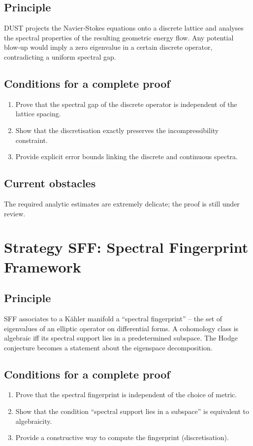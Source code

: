 \documentclass[11pt,a4paper]{article}
\begin{document}
\subsection{Principle}
DUST projects the Navier‑Stokes equations onto a discrete lattice and analyses the spectral properties of the resulting geometric energy flow. Any potential blow‑up would imply a zero eigenvalue in a certain discrete operator, contradicting a uniform spectral gap.

\subsection{Conditions for a complete proof}
\begin{enumerate}
\item Prove that the spectral gap of the discrete operator is independent of the lattice spacing.
\item Show that the discretisation exactly preserves the incompressibility constraint.
\item Provide explicit error bounds linking the discrete and continuous spectra.
\end{enumerate}

\subsection{Current obstacles}
The required analytic estimates are extremely delicate; the proof is still under review.

\section{Strategy SFF: Spectral Fingerprint Framework}

\subsection{Principle}
SFF associates to a Kähler manifold a “spectral fingerprint” – the set of eigenvalues of an elliptic operator on differential forms. A cohomology class is algebraic iff its spectral support lies in a predetermined subspace. The Hodge conjecture becomes a statement about the eigenspace decomposition.

\subsection{Conditions for a complete proof}
\begin{enumerate}
\item Prove that the spectral fingerprint is independent of the choice of metric.
\item Show that the condition “spectral support lies in a subspace” is equivalent to algebraicity.
\item Provide a constructive way to compute the fingerprint (discretisation).
\end{enumerate}
\end{document}
